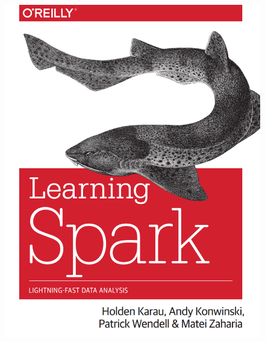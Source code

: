 \begin{frame}
\begin{figure}[ht]
\begin{minipage}[c][1\width]{
		0.3\textwidth}
	\includegraphics[width=\linewidth]{./Figures/chapter-00/learning_spark_front.png}
\end{minipage}

\end{figure}
\end{frame}

